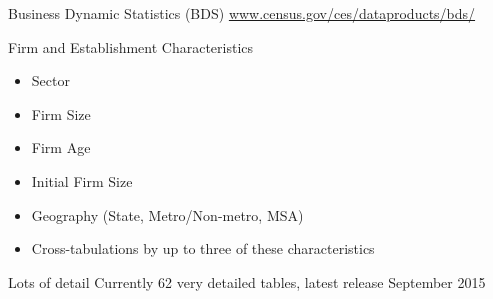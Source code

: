 
\begin{frame}{Business Dynamic Statistics (BDS)}
\href{http://www.census.gov/ces/dataproducts/bds/}{www.census.gov/ces/dataproducts/bds/}
\begin{block}{Firm and Establishment Characteristics}
\begin{itemize}
\item Sector
\item Firm Size
\item Firm Age
\item Initial Firm Size
\item Geography (State, Metro/Non-metro, MSA)
\item Cross-tabulations by up to three of these characteristics
\end{itemize}
\end{block}
\begin{block}{Lots of detail}
\alert{Currently} 62 very detailed tables, latest release September 2015
\end{block}
\end{frame}

